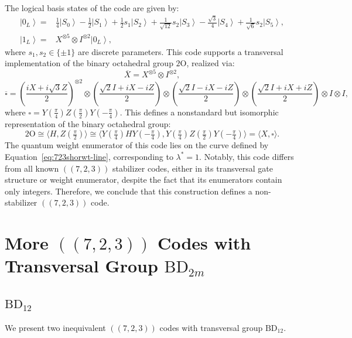 \documentclass[8pt]{article}
\theoremstyle{definition}
\begin{document}
The logical basis states of the code are given by:
\begin{align*}
    \left|0_{L}\right\rangle = & \frac{1}{4}\left|S_{0}\right\rangle -\frac{1}{2}\left|S_{1}\right\rangle +\frac{1}{2}s_{1}\left|S_{2}\right\rangle +\frac{1}{\sqrt{12}}s_{2}\left|S_{3}\right\rangle -\frac{\sqrt{3}}{4}\left|S_{4}\right\rangle +\frac{1}{\sqrt{6}}s_{2}\left|S_{5}\right\rangle , \\
    \left|1_{L}\right\rangle = & X^{\otimes5}\otimes I^{\otimes2}\left|0_{L}\right\rangle,
\end{align*}
where \(s_1, s_2 \in \{\pm 1\}\) are discrete parameters. This code supports a transversal implementation of the binary octahedral group \(2\mathrm{O}\), realized via:
\[ \overline{X}=X^{\otimes5}\otimes I^{\otimes2}, \]
\[ \overline{\square}=\left(\frac{iX+i\sqrt{3}Z}{2}\right)^{\otimes2}\otimes\left(\frac{\sqrt{2}I+iX-iZ}{2}\right)\otimes\left(\frac{\sqrt{2}I-iX-iZ}{2}\right)\otimes\left(\frac{\sqrt{2}I+iX+iZ}{2}\right)\otimes I\otimes I,\]
where \(\square = Y(\tfrac{\pi}{4})Z(\tfrac{\pi}{2})Y(-\tfrac{\pi}{4})\). This defines a nonstandard but isomorphic representation of the binary octahedral group:
\[ 2\mathrm{O} \cong \langle H, Z(\tfrac{\pi}{2}) \rangle \cong \langle Y(\tfrac{\pi}{4}) H Y(-\tfrac{\pi}{4}), Y(\tfrac{\pi}{4}) Z(\tfrac{\pi}{2}) Y(-\tfrac{\pi}{4}) \rangle = \langle X, \square \rangle. \]
The quantum weight enumerator of this code lies on the curve defined by Equation~\eqref{eq:723shorwt-line}, corresponding to \(\lambda^* = 1\). Notably, this code differs from all known \(((7,2,3))\) stabilizer codes, either in its transversal gate structure or weight enumerator, despite the fact that its enumerators contain only integers. Therefore, we conclude that this construction defines a non-stabilizer \(((7,2,3))\) code.

\section{More \texorpdfstring{$((7,2,3))$}{((7,2,3))} Codes with Transversal Group \texorpdfstring{$\mathrm{BD}_{2m}$}{BD₂ₘ}}\label{appendix:723BD2m}

\subsection{\texorpdfstring{$\mathrm{BD}_{12}$}{BD₁₂}}

We present two inequivalent \(((7,2,3))\) codes with transversal group \(\mathrm{BD}_{12}\).
\end{document}
